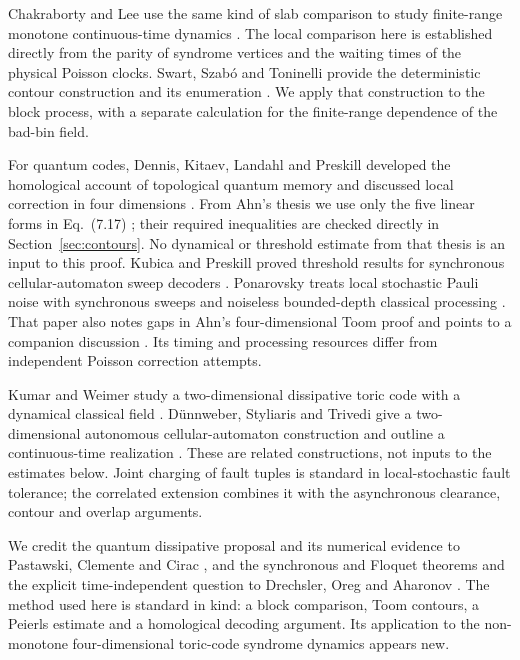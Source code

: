 Chakraborty and Lee use the same kind of slab comparison to study
finite-range monotone continuous-time dynamics
\cite[Theorem 1 and Appendix B]{ChakrabortyLee}. The local comparison here
is established directly from the parity of syndrome vertices and the
waiting times of the physical Poisson clocks. Swart, Szab\'o and
Toninelli provide the deterministic contour construction and its
enumeration \cite[Theorem 22 and Lemmas 38--40]{SST}. We apply that
construction to the block process, with a separate calculation for the
finite-range dependence of the bad-bin field.

For quantum codes, Dennis, Kitaev, Landahl and Preskill developed the
homological account of topological quantum memory and discussed local
correction in four dimensions \cite{DKLP}. From Ahn's thesis we use only
the five linear forms in Eq.~(7.17) \cite{Ahn}; their required
inequalities are checked directly in Section~\ref{sec:contours}.
No dynamical or threshold estimate from that thesis is an input to
this proof. Kubica and Preskill proved threshold results for
synchronous cellular-automaton sweep decoders \cite{KubicaPreskill}.
Ponarovsky treats local stochastic Pauli noise with synchronous sweeps
and noiseless bounded-depth classical processing
\cite[Sections 1.1--1.3, Theorems 6.3 and 7.3]{Ponarovsky}.
That paper also notes gaps in Ahn's four-dimensional Toom proof and
points to a companion discussion \cite[Section 1.1]{Ponarovsky}.
Its timing and processing resources differ from independent Poisson
correction attempts.

Kumar and Weimer study a two-dimensional dissipative toric code with
a dynamical classical field \cite{KumarWeimer}. D\"unnweber, Styliaris
and Trivedi give a two-dimensional autonomous cellular-automaton
construction and outline a continuous-time realization \cite{DST}.
These are related constructions, not inputs to the estimates below.
Joint charging of fault tuples is standard in local-stochastic
fault tolerance; the correlated extension combines it with the
asynchronous clearance, contour and overlap arguments.

We credit the quantum dissipative proposal and its numerical evidence
to Pastawski, Clemente and Cirac \cite{PCC}, and the synchronous and
Floquet theorems and the explicit time-independent question to
Drechsler, Oreg and Aharonov \cite{DOA}. The method used here is standard
in kind: a block comparison, Toom contours, a Peierls estimate and a
homological decoding argument. Its application to the non-monotone
four-dimensional toric-code syndrome dynamics appears new.

